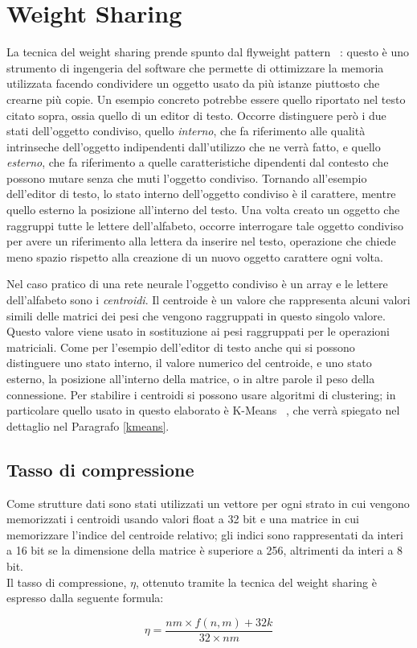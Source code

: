 \documentclass[12pt]{report}
\begin{document}
\newpage

\section{Weight Sharing}

La tecnica del weight sharing prende spunto dal flyweight pattern ~\cite{GOF}: questo è uno strumento di ingengeria del software che permette di ottimizzare la memoria utilizzata facendo condividere un oggetto usato da più istanze piuttosto che crearne più copie. Un esempio concreto potrebbe essere quello riportato nel testo citato sopra, ossia quello di un editor di testo. Occorre distinguere però i due stati dell'oggetto condiviso, quello \textit{interno}, che fa riferimento alle qualità intrinseche dell'oggetto indipendenti dall'utilizzo che ne verrà fatto, e quello \textit{esterno}, che fa riferimento a quelle caratteristiche dipendenti dal contesto che possono mutare senza che muti l'oggetto condiviso. Tornando all'esempio dell'editor di testo, lo stato interno dell'oggetto condiviso è il carattere, mentre quello esterno la posizione all'interno del testo. Una volta creato un oggetto che raggruppi tutte le lettere dell'alfabeto, occorre interrogare tale oggetto condiviso per avere un riferimento alla lettera da inserire nel testo, operazione che chiede meno spazio rispetto alla creazione di un nuovo oggetto carattere ogni volta. 

Nel caso pratico di una rete neurale l'oggetto condiviso è un array e le lettere dell'alfabeto sono i \textit{centroidi}. Il centroide è un valore che rappresenta alcuni valori simili delle matrici dei pesi che vengono raggruppati in questo singolo valore. Questo valore viene usato in sostituzione ai pesi raggruppati per le operazioni matriciali. Come per l'esempio dell'editor di testo anche qui si possono distinguere uno stato interno, il valore numerico del centroide, e uno stato esterno, la posizione all'interno della matrice, o in altre parole il peso della connessione.
Per stabilire i centroidi si possono usare algoritmi di clustering; in particolare quello usato in questo elaborato è K-Means ~\cite{KMeans}, che verrà spiegato nel dettaglio nel Paragrafo \ref{kmeans}. \\

\subsection{Tasso di compressione}
Come strutture dati sono stati utilizzati un vettore per ogni strato in cui vengono memorizzati i centroidi usando valori float a 32 bit e una matrice in cui memorizzare l'indice del centroide relativo; gli indici sono rappresentati da interi a 16 bit se la dimensione della matrice è superiore a 256, altrimenti da interi a 8 bit. \\
Il tasso di compressione, $\eta$, ottenuto tramite la tecnica del weight sharing è espresso dalla seguente formula:
\null\par\null
$$
\displaystyle{\eta=\frac{n m \times f(n,m) + 32k}{32 \times n m}}
$$
\end{document}
